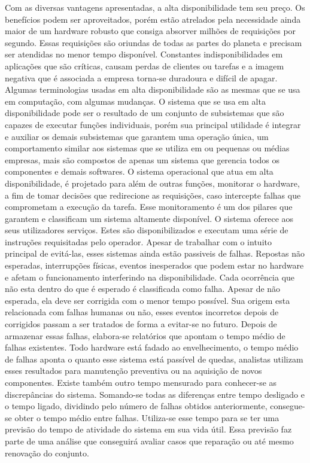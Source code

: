 Com as diversas vantagens apresentadas, a alta disponibilidade tem seu preço. Os benefícios podem ser aproveitados, porém estão atrelados pela necessidade ainda maior de um hardware robusto que consiga absorver milhões de requisições por segundo. Essas requisições são oriundas de todas as partes do planeta e precisam ser atendidas no menor tempo disponível. Constantes indisponibilidades em aplicações que são críticas, causam perdas de clientes ou tarefas e a imagem negativa que é associada a empresa torna-se duradoura e difícil de apagar.
Algumas terminologias usadas em alta disponibilidade são as mesmas que se usa em computação, com algumas mudanças. O sistema que se usa em alta disponibilidade pode ser o resultado de um conjunto de subsistemas que são capazes de executar funções individuais, porém sua principal utilidade é integrar e auxiliar os demais subsistemas que garantem uma operação única, um comportamento similar aos sistemas que se utiliza em ou pequenas ou médias empresas, mais são compostos de apenas um sistema que gerencia todos os componentes e demais softwares.
O sistema operacional que atua em alta disponibilidade, é projetado para além de outras funções, monitorar o hardware, a fim de tomar decisões que redirecione as requisições, caso intercepte falhas que comprometam a execução da tarefa. Esse monitoramento é um dos pilares que garantem e classificam um sistema altamente disponível.
O sistema oferece aos seus utilizadores serviços. Estes são disponibilizados e executam uma série de instruções requisitadas pelo operador.
Apesar de trabalhar com o intuito principal de evitá-las, esses sistemas ainda estão passiveis de falhas. Repostas não esperadas, interrupções físicas, eventos inesperados que podem estar no hardware e afetam o funcionamento interferindo na disponibilidade. Cada ocorrência que não esta dentro do que é esperado é classificada como falha. Apesar de não esperada, ela deve ser corrigida com o menor tempo possível. Sua origem esta relacionada com falhas humanas ou não, esses eventos incorretos depois de corrigidos passam a ser tratados de forma a evitar-se no futuro. Depois de armazenar essas falhas, elabora-se relatórios que apontam o tempo médio de falhas existentes. Todo hardware está fadado ao envelhecimento, o tempo médio de falhas aponta o quanto esse sistema está passível de quedas, analistas utilizam esses resultados para manutenção preventiva ou na aquisição de novos componentes.
Existe também outro tempo mensurado para conhecer-se as discrepâncias do sistema. Somando-se todas as diferenças entre tempo desligado e o tempo ligado, dividindo pelo número de falhas obtidos anteriormente, consegue-se obter o tempo médio entre falhas. Utiliza-se esse tempo para se ter uma previsão do tempo de atividade do sistema em sua vida útil. Essa previsão faz parte de uma análise que conseguirá avaliar casos que reparação ou até mesmo renovação do conjunto.
